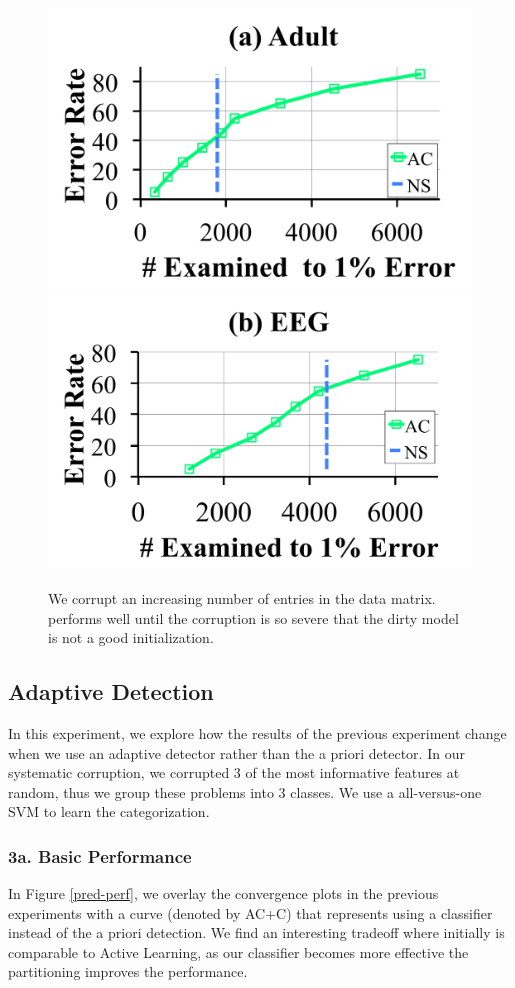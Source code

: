 \begin{figure}[ht!]
\centering
 \includegraphics[width=0.49\columnwidth]{exp/exp9a.pdf}
  \includegraphics[width=0.49\columnwidth]{exp/exp9b.pdf}
 \caption{We corrupt an increasing number of entries in the data matrix. \sys performs well until the corruption is so severe that the dirty model is not a good initialization.  \label{bias}}
\end{figure}

\subsection{Adaptive Detection}
In this experiment, we explore how the results of the previous experiment change when we use an adaptive detector rather than the a priori detector.
In our systematic corruption, we corrupted 3 of the most informative features at random, thus we group these problems into 3 classes.
We use a all-versus-one SVM to learn the categorization.

\subsubsection{3a. Basic Performance}
In Figure \ref{pred-perf}, we overlay the convergence plots in the previous experiments with a curve (denoted by AC+C) that represents \sys using a classifier instead of the a priori detection.
We find an interesting tradeoff where initially \sys is comparable to Active Learning, as our classifier becomes more effective the partitioning improves the performance.

